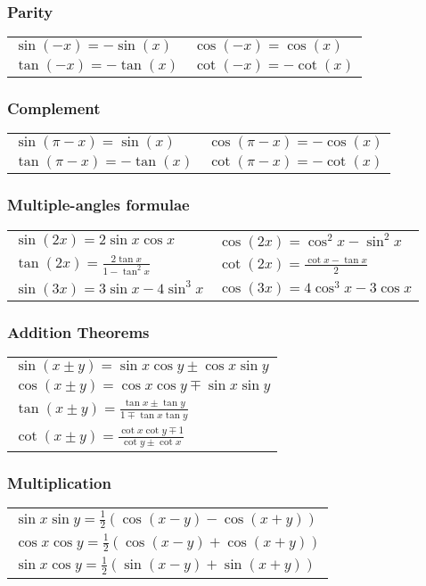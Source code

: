 \documentclass[a4paper, 10pt]{article}
\theoremstyle{definition}
\theoremstyle{ex}
\theoremstyle{named}
\begin{document}
\subsubsection*{Parity}
\begin{tabularx}{\linewidth}{XX}
    $\sin(-x) = - \sin(x)$ & $\cos(-x) = \cos(x)$ \\
    $\tan(-x) = - \tan(x)$ & $\cot(-x) = -\cot(x)$
\end{tabularx}

\subsubsection*{Complement}
\begin{tabularx}{\linewidth}{XX}
    $\sin(\pi - x) = \sin(x)$ & $\cos(\pi - x) = -\cos(x)$ \\
    $\tan(\pi - x) = - \tan(x)$ & $\cot(\pi - x) = -\cot(x)$
\end{tabularx}

\subsubsection*{Multiple-angles formulae}
\begin{tabularx}{\linewidth}{XX}
    $\sin(2x) = 2 \sin x \cos x $ & $\cos(2x) = \cos^2x - \sin^2x$ \\
    $\tan(2x) = \frac{2 \tan x}{1 - \tan^2x}$ & $\cot(2x) = \frac{\cot x - \tan x}{2}$ \\
    $\sin(3x) = 3 \sin x - 4 \sin^3 x$ & $\cos(3x) = 4 \cos^3 x - 3 \cos x$
\end{tabularx}

\subsubsection*{Addition Theorems}
\begin{tabularx}{\linewidth}{X}
    $\sin(x \pm y) = \sin x \cos y \pm \cos x \sin y$ \\
    $\cos(x \pm y) = \cos x \cos y \mp \sin x \sin y$ \\
    $\tan(x \pm y) = \frac{\tan x \pm \tan y}{1 \mp \tan x \tan y}$ \\
    $\cot(x \pm y) = \frac{\cot x \cot y \mp 1}{\cot y \pm \cot x}$
\end{tabularx}

\subsubsection*{Multiplication}
\begin{tabularx}{\linewidth}{X}
    $\sin x \sin y = \frac{1}{2}(\cos(x - y) - \cos(x + y))$ \\
    $\cos x \cos y = \frac{1}{2}(\cos(x - y) + \cos(x + y))$ \\
    $\sin x \cos y = \frac{1}{2}(\sin(x - y) + \sin(x + y))$ \\
\end{tabularx}
\end{document}
